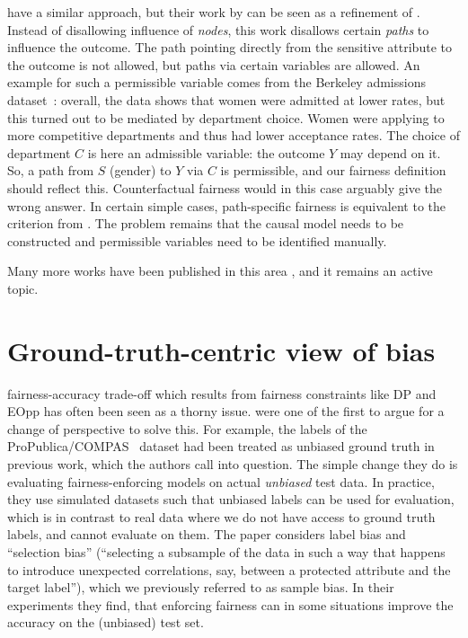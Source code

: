 \citet{chiappa2019path} have a similar approach, but their work by  can be seen as a refinement of
\citet{kilbertus2017avoiding}. Instead of disallowing influence of \emph{nodes}, this work
disallows certain \emph{paths} to influence the outcome. The path pointing directly from the
sensitive attribute to the outcome is not allowed, but paths via certain variables are allowed. An
example for such a permissible variable comes from the Berkeley admissions
dataset~\citep{bickel1975sex}: overall, the data shows that women were admitted at lower rates, but
this turned out to be mediated by department choice. Women were applying to more competitive
departments and thus had lower acceptance rates. The choice of department \(C\) is here an
admissible variable: the outcome \(Y\) may depend on it. So, a path from \(S\) (gender) to \(Y\)
via \(C\) is permissible, and our fairness definition should reflect this. Counterfactual fairness
\citep{kusner2017counterfactual} would in this case arguably give the wrong answer. In certain
simple cases, path-specific fairness is equivalent to the criterion from
\citet{kilbertus2017avoiding}. The problem remains that the causal model needs to be constructed
and permissible variables need to be identified manually.

Many more works have been published in this area
\citep[\eg,][]{wu2019pc,kilbertus2020sensitivity,creager2020causal}, and it remains an active
topic.
%


\section{Ground-truth-centric view of bias}%
fairness-accuracy trade-off which results from fairness constraints like \ac{DP} and \ac{EOpp} has
often been seen as a thorny issue. \citet{wick2019unlocking} were one of the first to argue for a
change of perspective to solve this. For example, the labels of the
ProPublica/COMPAS~\citep{angwin2016machine} dataset had been treated as unbiased ground truth in
previous work, which the authors call into question. The simple change they do is evaluating
fairness-enforcing models on actual \emph{unbiased} test data. In practice, they use simulated
datasets such that unbiased labels can be used for evaluation, which is in contrast to real data
where we do not have access to ground truth labels, and cannot evaluate on them. The paper
considers label bias and ``selection bias'' (``selecting a subsample of the data in such a way that
happens to introduce unexpected correlations, say, between a protected attribute and the target
label''), which we previously referred to as sample bias. In their experiments they find, that
enforcing fairness can in some situations improve the accuracy on the (unbiased) test set.


